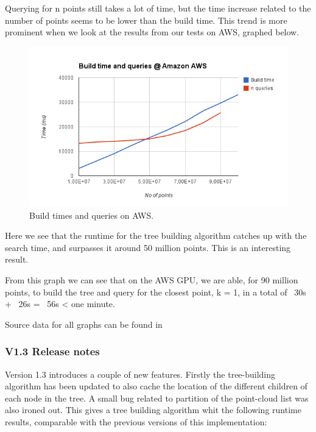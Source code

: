 Querying for n points still takes a lot of time, but the time increase related to the number of points seems to be lower than the build time. This trend is more prominent when we look at the results from our tests on AWS, graphed below.

\begin{figure}[ht!]
\centering
\includegraphics[width=120mm]{../gfx/v14_build_query_aws.png}

\caption{Build times and queries on AWS.}
\label{fig:v14_build_query_aws}
\end{figure}

Here we see that the runtime for the tree building algorithm catches up with the search time, and surpasses it around 50 million points. This is an interesting result.

From this graph we can see that on the AWS GPU, we are able, for 90 million points, to build the tree and query for the closest point, k = 1, in a total of ~30s + ~26s = ~56s < one minute.

Source data for all graphs can be found in


\subsubsection{V1.3 Release notes} %
\label{ssub:v13_release_notes}

Version 1.3 introduces a couple of new features. Firstly the tree-building algorithm has been updated to also cache the location of the different children of each node in the tree. A small bug related to partition of the point-cloud list was also ironed out. This gives a tree building algorithm whit the following runtime results, comparable with the previous versions of this implementation:

